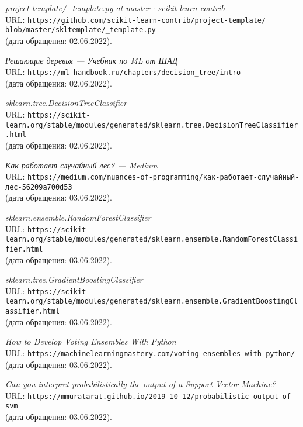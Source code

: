 \begin{thebibliography}{99}
{\itshape project-template/\_template.py at master $\cdot$ scikit-learn-contrib}\\
URL: \texttt{https://github.com/scikit-learn-contrib/project-template/\\blob/master/skltemplate/\_template.py}\\
(дата обращения: 02.06.2022).

{\itshape Решающие деревья --- Учебник по ML от ШАД}\\
URL: \texttt{https://ml-handbook.ru/chapters/decision\_tree/intro}\\
(дата обращения: 02.06.2022).

{\itshape sklearn.tree.DecisionTreeClassifier}\\
URL: \texttt{https://scikit-learn.org/stable/modules/generated/sklearn.tree.DecisionTreeClassifier.html}\\
(дата обращения: 02.06.2022).

{\itshape Как работает случайный лес? --- Medium}\\
URL: \texttt{https://medium.com/nuances-of-programming/как-работает-случайный-лес-56209a700d53}\\
(дата обращения: 03.06.2022).

{\itshape sklearn.ensemble.RandomForestClassifier}\\
URL: \texttt{https://scikit-learn.org/stable/modules/generated/sklearn.ensemble.RandomForestClassifier.html}\\
(дата обращения: 03.06.2022).

{\itshape sklearn.tree.GradientBoostingClassifier}\\
URL: \texttt{https://scikit-learn.org/stable/modules/generated/sklearn.ensemble.GradientBoostingClassifier.html}\\
(дата обращения: 03.06.2022).

{\itshape How to Develop Voting Ensembles With Python}\\
URL: \texttt{https://machinelearningmastery.com/voting-ensembles-with-python/}\\
(дата обращения: 03.06.2022).

{\itshape Can you interpret probabilistically the output of a Support Vector Machine?}\\
URL: \texttt{https://mmuratarat.github.io/2019-10-12/probabilistic-output-of-svm}\\
(дата обращения: 03.06.2022).

\end{thebibliography}
\pagebreak
